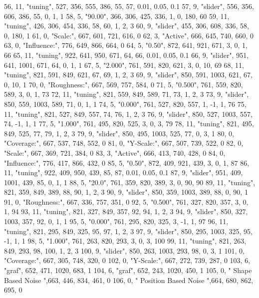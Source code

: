    56,	11,	"tuning",	527, 356, 555, 386, 55, 57, 0.01, 0.05, 0.1
   57,	9,	"slider",	556, 356, 606, 386, 55, 0, 1, 1
   58,	5,	"90.00",	366, 306, 425, 336, 1, 0, 180, 60
   59,	11,	"tuning",	426, 306, 454, 336, 58, 60, 1, 2, 3
   60,	9,	"slider",	455, 306, 608, 336, 58, 0, 180, 1
   61,	0,	"Scale:",	667, 601, 721, 616, 0
   62,	3,	"Active",	666, 645, 740, 660, 0
   63,	0,	"Influence:",	776, 649, 866, 664, 0
   64,	5,	"0.50",		872, 641, 921, 671, 3, 0, 1, 66
   65,	11,	"tuning",	922, 641, 950, 671, 64, 66, 0.01, 0.05, 0.1
   66,	9,	"slider",	951, 641, 1001, 671, 64, 0, 1, 1
   67,	5,	"2.000",	761, 591, 820, 621, 3, 0, 10, 69
   68,	11,	"tuning",	821, 591, 849, 621, 67, 69, 1, 2, 3
   69,	9,	"slider",	850, 591, 1003, 621, 67, 0, 10, 1
   70,	0,	"Roughness:",	667, 569, 757, 584, 0
   71,	5,	"0.500",	761, 559, 820, 589, 3, 0, 1, 73
   72,	11,	"tuning",	821, 559, 849, 589, 71, 73, 1, 2, 3
   73,	9,	"slider",	850, 559, 1003, 589, 71, 0, 1, 1
   74,	5,	"0.000",	761, 527, 820, 557, 1, -1, 1, 76
   75,	11,	"tuning",	821, 527, 849, 557, 74, 76, 1, 2, 3
   76,	9,	"slider",	850, 527, 1003, 557, 74, -1, 1, 1
   77,	5,	"1.000",	761, 495, 820, 525, 3, 0, 3, 79
   78,	11,	"tuning",	821, 495, 849, 525, 77, 79, 1, 2, 3
   79,	9,	"slider",	850, 495, 1003, 525, 77, 0, 3, 1
   80,	0,	"Coverage:",	667, 537, 748, 552, 0
   81,	0,	"Y-Scale:",	667, 507, 739, 522, 0
   82,	0,	"Scale:",	667, 369, 721, 384, 0
   83,	3,	"Active",	666, 413, 740, 428, 0
   84,	0,	"Influence:",	776, 417, 866, 432, 0
   85,	5,	"0.50",		872, 409, 921, 439, 3, 0, 1, 87
   86,	11,	"tuning",	922, 409, 950, 439, 85, 87, 0.01, 0.05, 0.1
   87,	9,	"slider",	951, 409, 1001, 439, 85, 0, 1, 1
   88,	5,	"20.0",		761, 359, 820, 389, 3, 0, 90, 90
   89,	11,	"tuning",	821, 359, 849, 389, 88, 90, 1, 2, 3
   90,	9,	"slider",	850, 359, 1003, 389, 88, 0, 90, 1
   91,	0,	"Roughness:",	667, 336, 757, 351, 0
   92,	5,	"0.500",	761, 327, 820, 357, 3, 0, 1, 94
   93,	11,	"tuning",	821, 327, 849, 357, 92, 94, 1, 2, 3
   94,	9,	"slider",	850, 327, 1003, 357, 92, 0, 1, 1
   95,	5,	"0.000",	761, 295, 820, 325, 3, -1, 1, 97
   96,	11,	"tuning",	821, 295, 849, 325, 95, 97, 1, 2, 3
   97,	9,	"slider",	850, 295, 1003, 325, 95, -1, 1, 1
   98,	5,	"1.000",	761, 263, 820, 293, 3, 0, 3, 100
   99,	11,	"tuning",	821, 263, 849, 293, 98, 100, 1, 2, 3
   100,	9,	"slider",	850, 263, 1003, 293, 98, 0, 3, 1
   101,	0,	"Coverage:",	667, 305, 748, 320, 0
   102,	0,	"Y-Scale:",	667, 272, 739, 287, 0
   103,	6,	"graf",		652, 471, 1020, 683, 1
   104,	6,	"graf",		652, 243, 1020, 450, 1
   105,	0,	" Shape Based Noise ",663, 446, 834, 461, 0
   106,	0,	" Position Based Noise ",664, 680, 862, 695, 0
